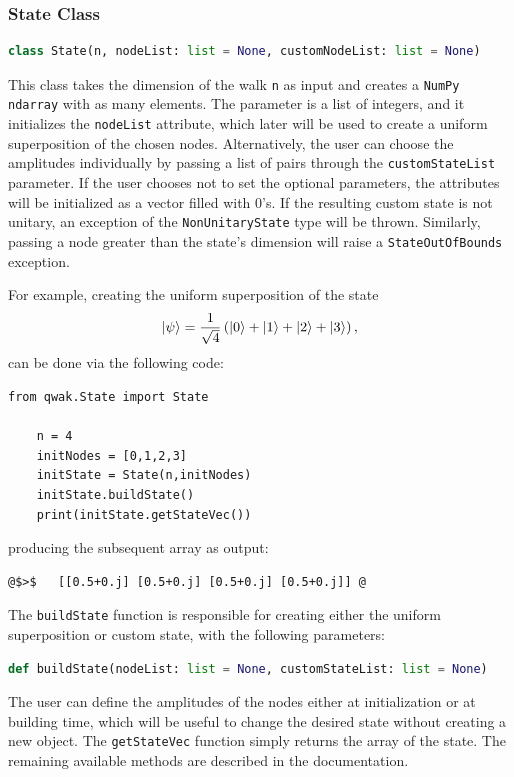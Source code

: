 \documentclass[main.tex]{subfiles}
\begin{document}
\subsubsection{State Class}
\begin{lstlisting}[style=commands,language=Python]
    class State(n, nodeList: list = None, customNodeList: list = None)
\end{lstlisting}
This class takes the dimension of the walk \texttt{n} as input and creates a
\texttt{NumPy ndarray} with as many elements. The  parameter is
a list of integers, and it initializes the \texttt{nodeList} attribute, which
later will be used to create a uniform superposition of the chosen nodes.
Alternatively, the user can choose the amplitudes individually by passing a
list of pairs through the \texttt{customStateList} parameter. If the user
chooses not to set the optional parameters, the attributes will be initialized
as a vector filled with $0$'s. If the resulting custom state is not
unitary, an exception of the \texttt{NonUnitaryState} type will be thrown.
Similarly, passing a node greater than the state's dimension will
raise a \texttt{StateOutOfBounds} exception.\par 

For example, creating the uniform superposition of the state
\begin{equation}
    \ket{\psi} = \frac{1}{\sqrt{4}}\left( \ket{0} + \ket{1} +\ket{2} +\ket{3}\right),
\end{equation}
can be done via the following code:
\begin{lstlisting}[style=code]
    from qwak.State import State

    n = 4
    initNodes = [0,1,2,3]
    initState = State(n,initNodes)
    initState.buildState()
    print(initState.getStateVec())
\end{lstlisting}
producing the subsequent array as output:

\begin{lstlisting}[style=commands,mathescape]
@$>$   [[0.5+0.j] [0.5+0.j] [0.5+0.j] [0.5+0.j]] @
\end{lstlisting}

The \texttt{buildState} function is responsible for creating either the uniform
superposition or custom state, with the following parameters: 
\begin{lstlisting}[style=commands,mathescape,language=Python]
    def buildState(nodeList: list = None, customStateList: list = None)
\end{lstlisting}
The user can define the amplitudes of the nodes either at
initialization or at building time, which will be useful to change the desired
state without creating a new object. The \texttt{getStateVec} function simply
returns the array of the state. The remaining available methods are described
in the documentation. 
\end{document}

